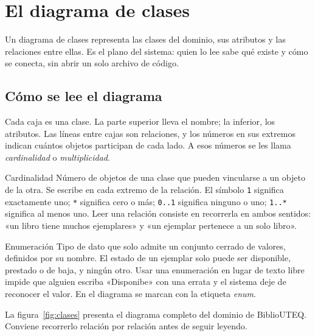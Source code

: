 \documentclass[11pt,a4paper,openany]{book}
\begin{document}
\section{El diagrama de clases}
\label{sec:diagrama-clases}

Un diagrama de clases representa las clases del dominio, sus atributos y las relaciones entre ellas. Es el plano del sistema: quien lo lee sabe qué existe y cómo se conecta, sin abrir un solo archivo de código.

\subsection{Cómo se lee el diagrama}
\label{sec:leer-diagrama}

Cada caja es una clase. La parte superior lleva el nombre; la inferior, los atributos. Las líneas entre cajas son relaciones, y los números en sus extremos indican cuántos objetos participan de cada lado. A esos números se les llama \emph{cardinalidad} o \emph{multiplicidad}.

\begin{cajadefinicion}{Cardinalidad}
	Número de objetos de una clase que pueden vincularse a un objeto de la otra. Se escribe en cada extremo de la relación. El símbolo \texttt{1} significa exactamente uno; \texttt{*} significa cero o más; \texttt{0..1} significa ninguno o uno; \texttt{1..*} significa al menos uno. Leer una relación consiste en recorrerla en ambos sentidos: «un libro tiene muchos ejemplares» y «un ejemplar pertenece a un solo libro».
\end{cajadefinicion}

\begin{cajadefinicion}{Enumeración}
	Tipo de dato que solo admite un conjunto cerrado de valores, definidos por su nombre. El estado de un ejemplar solo puede ser disponible, prestado o de baja, y ningún otro. Usar una enumeración en lugar de texto libre impide que alguien escriba «Disponibe» con una errata y el sistema deje de reconocer el valor. En el diagrama se marcan con la etiqueta \emph{enum}.
\end{cajadefinicion}

La figura~\ref{fig:clases} presenta el diagrama completo del dominio de BiblioUTEQ. Conviene recorrerlo relación por relación antes de seguir leyendo.
\end{document}
